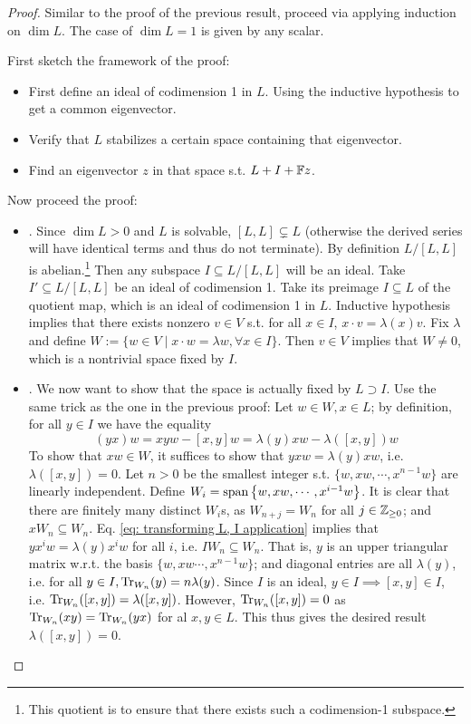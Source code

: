 \documentclass{article}
\begin{document}
\begin{proof}
    Similar to the proof of the previous result, proceed via applying induction on $\dim L$. The case of $\dim L = 1$ is given by any scalar. 
    
    First sketch the framework of the proof:
    \begin{itemize}
        \item First define an ideal of codimension 1 in $L$. Using the inductive hypothesis to get a common eigenvector.
        \item Verify that $L$ stabilizes a certain space containing that eigenvector. 
        \item Find an eigenvector $z$ in that space s.t. $L + I + \mathbb{F} z$.
    \end{itemize}
    Now proceed the proof:
    \begin{itemize}
        \item {}. Since $\dim L > 0$ and $L$ is solvable, $[L, L] \subsetneq L$ (otherwise the derived series will have identical terms and thus do not terminate). By definition $L/[L, L]$ is abelian.\footnote{This quotient is to ensure that there exists such a codimension-1 subspace.} Then any subspace $I \subseteq L/[L, L]$ will be an ideal. Take $I' \subseteq L/[L, L]$ be an ideal of codimension 1. Take its preimage $I \subseteq L$ of the quotient map, which is an ideal of codimension 1 in $L$. Inductive hypothesis implies that there exists nonzero $v \in V$ s.t. for all $x \in I$, $x \cdot v = \lambda(x)v$. Fix $\lambda$ and define $W := \{ w \in V \mid x \cdot w = \lambda w, \forall x \in I \}$. Then $v \in V$ implies that $W \neq 0$, which is a nontrivial space fixed by $I$.
        \item {}. We now want to show that the space is actually fixed by $L \supset I$. Use the same trick as the one in the previous proof: Let $w \in W, x \in L$; by definition, for all $y \in I$ we have the equality
        \begin{equation}\tag{$\ast$}\label{eq: transforming L, I application}
            (yx) w = xyw - [x, y]w = \lambda(y) xw - \lambda([x, y]) w
        \end{equation}
        To show that $xw \in W$, it suffices to show that $y xw = \lambda(y) xw$, i.e. $\lambda([x, y]) = 0$. Let $n > 0$ be the smallest integer s.t. $\{ w, xw, \cdots, x^{n-1}w \}$ are linearly independent. Define $W_i = \operatorname{span}\left\{ w, xw, \cdots, x^{i-1}w \right\}$. It is clear that there are finitely many distinct $W_i$s, as $W_{n+j} = W_n$ for all $j \in \mathbb{Z}_{\geq 0}$; and $x W_n \subseteq W_n$. Eq. \eqref{eq: transforming L, I application} implies that $y x^i w = \lambda(y) x^i w$ for all $i$, i.e. $I W_n \subseteq W_n$. That is, $y$ is an upper triangular matrix w.r.t. the basis $\{ w, xw \cdots, x^{n-1}w \}$; and diagonal entries are all $\lambda(y)$, i.e. for all $y \in I, \operatorname{Tr}_{W_n}(y) = n \lambda(y)$. Since $I$ is an ideal, $y \in I \implies [x, y] \in I$, i.e. $\operatorname{Tr}_{W_n}([x, y]) = \lambda([x, y])$. However, $\operatorname{Tr}_{W_n}([x, y]) = 0$ as $\operatorname{Tr}_{W_n}(xy) = \operatorname{Tr}_{W_n}(yx)$ for al $x, y \in L$. This thus gives the desired result $\lambda([x, y]) = 0$.

\end{itemize}
\end{proof}
\end{document}

